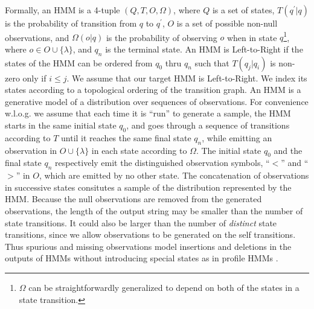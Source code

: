 \documentclass[letterpaper]{article}
\begin{document}
Formally, an HMM is a 4-tuple $(Q, T, O, \Omega)$, where $Q$ is a set of states, $T(q^\prime|q)$ is the probability of transition from $q$ to $q^\prime$, $O$ is a set of possible non-null observations, and $\Omega(o|q)$ is the probability of observing $o$ when in state $q$\footnote{$\Omega$ can be straightforwardly generalized to depend on both of the states in a state transition.},  where $o \in O \cup \{\lambda\}$, and $q_n$ is the terminal state. An HMM is Left-to-Right if the states of the HMM can be ordered from $q_0$ thru $q_n$ such that $T(q_j|q_i)$ is non-zero only if $i \leq j$. We assume that our target HMM is Left-to-Right. We index its states according to a topological ordering of the transition graph. An HMM is a generative model of a distribution over sequences of observations. For convenience w.l.o.g. we assume that each time it is ``run'' to generate a sample, the HMM starts in the same initial state $q_0$, and goes through a sequence of transitions according to $T$ until it reaches the same final state $q_n$, while emitting an observation in $O \cup \{\lambda\}$ in each state according to $\Omega$. The initial state $q_0$ and the final state $q_n$ respectively emit the distinguished observation symbols, ``$<$'' and ``$>$'' in $O$, which are emitted by no other state.
The concatenation of observations in successive states consitutes a sample of the distribution represented by the HMM. Because the null observations are removed from the generated observations, the length of the output string may be smaller than the number of state transitions. It could also be larger than the number of {\em distinct} state transitions, since we allow observations to be generated on the self transitions. Thus spurious and missing observations model insertions and deletions in the outputs of HMMs without introducing special states as in profile HMMs \cite{profileHMMs}. %

\end{document}
